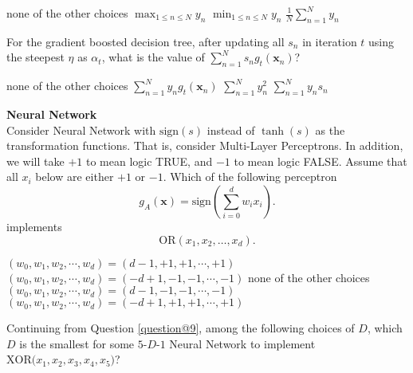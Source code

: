 \documentclass[a4paper,10pt]{exam}
\begin{document}
\begin{questions}
	\begin{checkboxes}
		\choice none of the other choices
		\choice $\max_{1 \le n \le N} y_n$
		\choice $\min_{1 \le n \le N} y_n$
		\CorrectChoice $\frac{1}{N} \sum_{n=1}^N y_n$\\
	\end{checkboxes}

	\question For the gradient boosted decision tree, after updating all $s_n$ in iteration $t$ using the steepest $\eta$ as $\alpha_t$, what is the value of $\sum_{n=1}^N s_n g_t(\mathbf{x}_n)$?

	\begin{checkboxes}
		\choice none of the other choices
		\CorrectChoice $\sum_{n=1}^N y_n g_t(\mathbf{x}_n)$
		\choice $\sum_{n=1}^N y_n^2$
		\choice $\sum_{n=1}^N y_n s_n$
		\choice 0	\\
	\end{checkboxes}

	\question \textbf{Neural Network}\\
	Consider Neural Network with $\mbox{sign}(s)$ instead of $\tanh(s)$ as the transformation functions. That is, consider Multi-Layer Perceptrons. In addition, we will take $+1$ to mean logic TRUE, and ${{ - }}1$ to mean logic FALSE. Assume that all $x_i$ below are either $+1$ or ${{ - }}1$. Which of the following perceptron
	\[g_A(\mathbf{x}) = \mbox{sign}\left(\sum_{i=0}^d w_i x_i\right).\]
	implements
	\[\text{OR}\left(x_1,x_2,\ldots,x_d\right).\]
	\begin{checkboxes}
		\CorrectChoice $(w_0, w_1, w_2, \cdots, w_d) = (d-1, +1, +1, \cdots, +1)$
		\choice $(w_0, w_1, w_2, \cdots, w_d) = (-d+1, -1, -1, \cdots, -1)$
		\choice none of the other choices
		\choice $(w_0, w_1, w_2, \cdots, w_d) = (d-1, -1, -1, \cdots, -1)$
		\choice $(w_0, w_1, w_2, \cdots, w_d) = (-d+1, +1, +1, \cdots, +1)$\\
	\end{checkboxes}

	\question Continuing from Question \ref{question@9}, among the following choices of $D$, which $D$ is the smallest for some $5$-$D$-$1$ Neural Network to implement $\text{XOR}\bigl(x_1,x_2,x_3,x_4, x_5\bigr)$?
	\begin{checkboxes}
		\choice 1
		\choice 9
		\choice 7
		\CorrectChoice 5
		\choice 3\\
	\end{checkboxes}


\end{questions}
\end{document}
